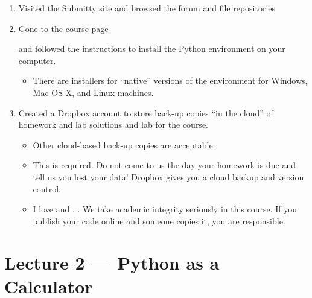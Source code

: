 \documentclass[letterpaper,10pt,english]{sphinxmanual}
\begin{document}
\begin{enumerate}
\def\theenumi{\arabic{enumi}}
\def\labelenumi{\theenumi .}
\makeatletter\def\p@enumii{\p@enumi \theenumi .}\makeatother
\item {} 
Visited the Submitty site and browsed the forum and file repositories
\begin{quote}

\end{quote}

\item {} 
Gone to the course page
\begin{quote}

\end{quote}

and followed the instructions to install the Python environment on
your computer.
\begin{itemize}
\item {} 
There are installers for “native” versions of the environment for
Windows, Mac OS X, and Linux machines.

\end{itemize}

\item {} 
Created a Dropbox account to store back-up copies “in the cloud” of
homework and lab solutions and lab for the course.
\begin{itemize}
\item {} 
Other cloud-based back-up copies are acceptable.

\item {} 
This is required. Do not come to us the day your homework is due and tell us you lost your data! Dropbox gives you a  cloud backup and version control.

\item {} 
I love  and . . We take academic integrity seriously in this course. If you publish your code online and someone copies it, you are responsible.

\end{itemize}

\end{enumerate}


\chapter{Lecture 2 — Python as a Calculator}
\label{\detokenize{lecture_notes/lec02_calculator:lecture-2-python-as-a-calculator}}\label{\detokenize{lecture_notes/lec02_calculator::doc}}
\end{document}
